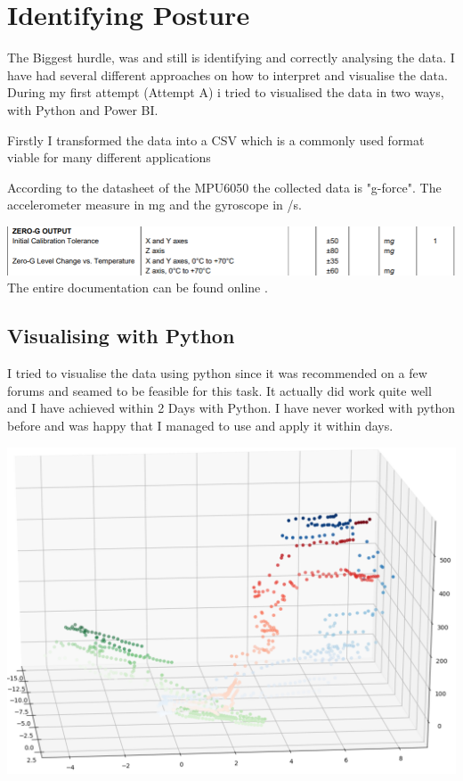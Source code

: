 \section{Identifying Posture}

The Biggest hurdle, was and still is identifying and correctly analysing the data. I have had several different approaches on how to interpret and visualise the data. During my first attempt (Attempt A) i tried to visualised the data in two ways, with Python and Power BI.

Firstly I transformed the data into a CSV which is a commonly used format viable for many different applications

According to the datasheet of the MPU6050 the collected data is "g-force". The accelerometer measure in mg and the gyroscope in \degree/s. 

\includegraphics[width=\linewidth]{images/MPU6050_DATA.png}
The entire documentation can be found online \cite{MPU6000D59:online}.

\subsection{Visualising with Python}

I tried to visualise the data using python since it was recommended on a few forums and seamed to be feasible for this task. It actually did work quite well and I have achieved within 2 Days with Python. I have never worked with python before and was happy that I managed to use and apply it within days. 

\includegraphics[width=\linewidth]{images/PyVisualisation.png}


